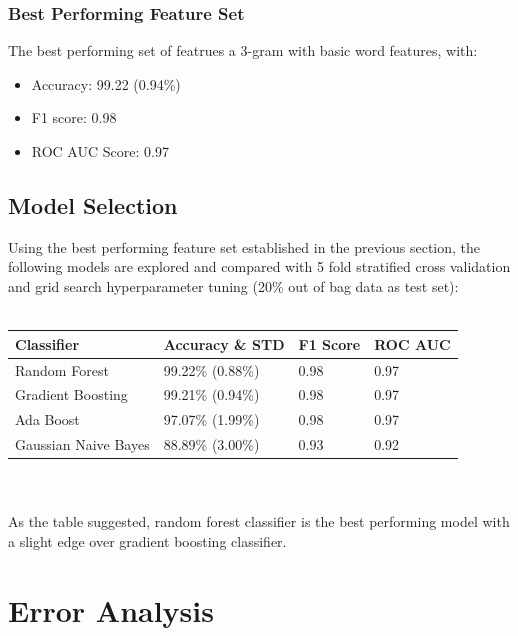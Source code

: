 \documentclass{article}
\begin{document}
    \subsubsection{Best Performing Feature Set}
    The best performing set of featrues a 3-gram with basic word features, with:
    \begin{itemize}
        \item Accuracy: 99.22 (0.94\%)
        \item F1 score: 0.98
        \item ROC AUC Score:  0.97
    \end{itemize}
    \subsection{Model Selection}
    Using the best performing feature set established in the previous section, the following models are explored and compared with 5 fold stratified cross validation and grid search hyperparameter tuning (20\% out of bag data as test set):\\\\
    \begin{tabular}{|M{4cm}||M{4cm}|M{2cm}|M{2cm}|}
        \hline
        \textbf{Classifier} & \textbf{Accuracy \& STD} & \textbf{F1 Score} & \textbf{ROC AUC}\\
        \hline
        Random Forest & 99.22\% (0.88\%) & 0.98 & 0.97  \\
        \hline
        Gradient Boosting & 99.21\% (0.94\%) & 0.98 & 0.97  \\
        \hline
        Ada Boost & 97.07\% (1.99\%) & 0.98 & 0.97  \\
        \hline
        Gaussian Naive Bayes & 88.89\% (3.00\%) & 0.93 & 0.92  \\
        \hline
    \end{tabular}\\\\
    As the table suggested, random forest classifier is the best performing model with a slight edge over gradient boosting classifier.\\
    \section{Error Analysis}
\end{document}
